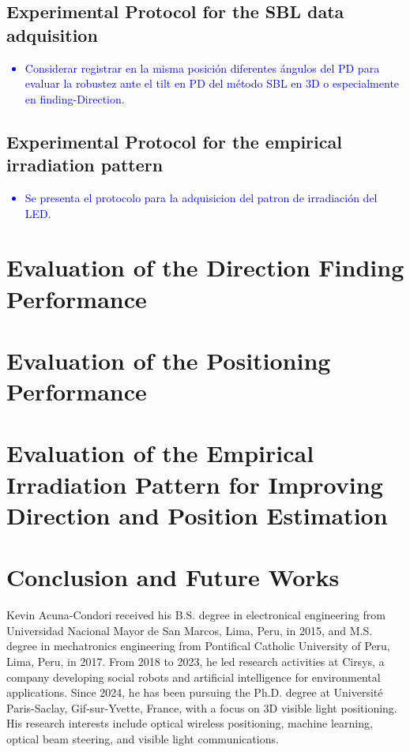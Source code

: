 \documentclass[journal]{IEEEtran}
\begin{document}
    \subsection{Experimental Protocol for the SBL data adquisition}
    \textcolor{blue}{
        \begin{itemize}
            \item Considerar registrar en la misma posición diferentes ángulos del PD para evaluar la robustez ante el tilt en PD del método SBL en 3D o especialmente en finding-Direction.
        \end{itemize}
    }

    \subsection{Experimental Protocol for the empirical irradiation pattern}
    \textcolor{blue}{
        \begin{itemize}
            \item Se presenta el protocolo para la adquisicion del patron de irradiación del LED.
        \end{itemize}
    }

\section{Evaluation of the Direction Finding Performance}
\section{Evaluation of the Positioning Performance}
\section{Evaluation of the Empirical Irradiation Pattern for Improving Direction and Position Estimation}

\section{Conclusion and Future Works}



\cite{Acuna2025,acuna2026robust,acuna2025model}



\begin{IEEEbiographynophoto}{Kevin Acuna-Condori}
received his B.S. degree in electronical engineering from Universidad Nacional Mayor de San Marcos, Lima, Peru, in 2015, and M.S. degree in mechatronics engineering from Pontifical Catholic University of Peru, Lima, Peru, in 2017. 
From 2018 to 2023, he led research activities at Cirsys, a company developing social robots and artificial intelligence for environmental applications.
Since 2024, he has been pursuing the Ph.D. degree at Université Paris-Saclay, Gif-sur-Yvette, France, with a focus on 3D visible light positioning.
His research interests include optical wireless positioning, machine learning, optical beam steering, and visible light communications.
\end{IEEEbiographynophoto}
\end{document}
